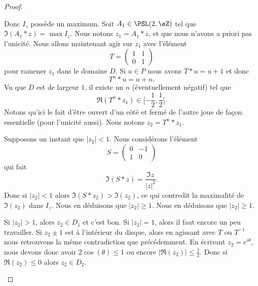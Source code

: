 \begin{proof}
\begin{subproof}
            Donc \( I_z\) possède un maximum. Soit \( A_1\in\PSL(2,\eZ)\) tel que \( \Im(A_1*z)=\max I_z\). Nous notons \( z_1=A_1*z\), et que nous n'avons a priori pas l'unicité. Nous allons maintenant agir sur \( z_1\) avec l'élément
            \begin{equation}
                T=\begin{pmatrix}
                    1    &   1    \\
                    0    &   1
                \end{pmatrix}
            \end{equation}
            pour ramener \( z_1\) dans le domaine \( D\). Si \( u\in P\) nous avons \( T*u=u+1\) et donc
            \begin{equation}
                T^n*u=u+n.
            \end{equation}
            Vu que \( D\) est de largeur \( 1\), il existe un \( n\) (éventuellement négatif) tel que
            \begin{equation}
                \Re(T^n*z_1)\in\mathopen[ -\frac{ 1 }{2} , \frac{ 1 }{2} [.
            \end{equation}
            Notons qu'ici le fait d'être ouvert d'un côté et fermé de l'autre joue de façon essentielle (pour l'unicité aussi). Nous notons \( z_2=T^n*z_1\).

            Supposons un instant que \( | z_2 |<1\). Nous considérons l'élément
            \begin{equation}
                S=\begin{pmatrix}
                    0    &   -1    \\
                    1    &   0
                \end{pmatrix}
            \end{equation}
            qui fait
            \begin{equation}
                \Im(S*z)=\frac{ \Im z }{| z |^2}.
            \end{equation}
            Donc si \( | z_2 |<1\) alors \( \Im(S*z_2)>\Im(z_2)\), ce qui contredit la maximalité de \( \Im(z_2)\) dans \( I_z\). Nous en déduisons que \( | z_2 |\geq 1\). Nous en déduisons que \( | z_2 |\geq 1\).

            Si \( | z_2 |>1\), alors \( z_2\in D_1\) et c'est bon. Si \( | z_2 |=1\), alors il faut encore un peu travailler. Si \( z_2\pm 1\) est à l'intérieur du disque, alors en agissant avec \( T\) ou \( T^{-1}\) nous retrouvons la même contradiction que précédemment. En écrivant \( z_2= e^{i\theta}\), nous devons donc avoir \( 2\cos(\theta)\leq 1\) ou encore \( |\Re(z_2)|\leq \frac{ 1 }{2}\). Donc si \( \Re(z_2)\leq 0\) alors \( z_2\in D_2\).


\end{subproof}
\end{proof}
